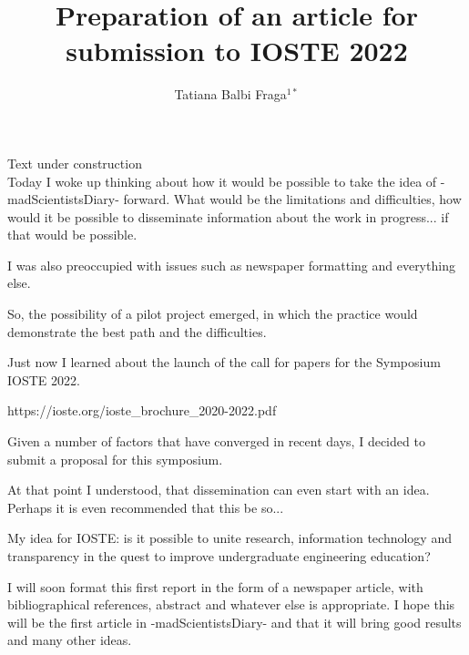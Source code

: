 \documentclass{book}
\title{Preparation of an article for submission to IOSTE 2022}
\author{Tatiana Balbi Fraga$^{1*}$}
\begin{document}
Text under construction \\

Today I woke up thinking about how it would be possible to take the idea of -madScientistsDiary- forward. What would be the limitations and difficulties, how would it be possible to disseminate information about the work in progress... if that would be possible.

I was also preoccupied with issues such as newspaper formatting and everything else.

So, the possibility of a pilot project emerged, in which the practice would demonstrate the best path and the difficulties.

Just now I learned about the launch of the call for papers for the Symposium IOSTE 2022.

https://ioste.org/ioste\_brochure\_2020-2022.pdf

Given a number of factors that have converged in recent days, I decided to submit a proposal for this symposium.

At that point I understood, that dissemination can even start with an idea. Perhaps it is even recommended that this be so...

My idea for IOSTE: is it possible to unite research, information technology and transparency in the quest to improve undergraduate engineering education?

I will soon format this first report in the form of a newspaper article, with bibliographical references, abstract and whatever else is appropriate. I hope this will be the first article in -madScientistsDiary- and that it will bring good results and many other ideas.
\end{document}

